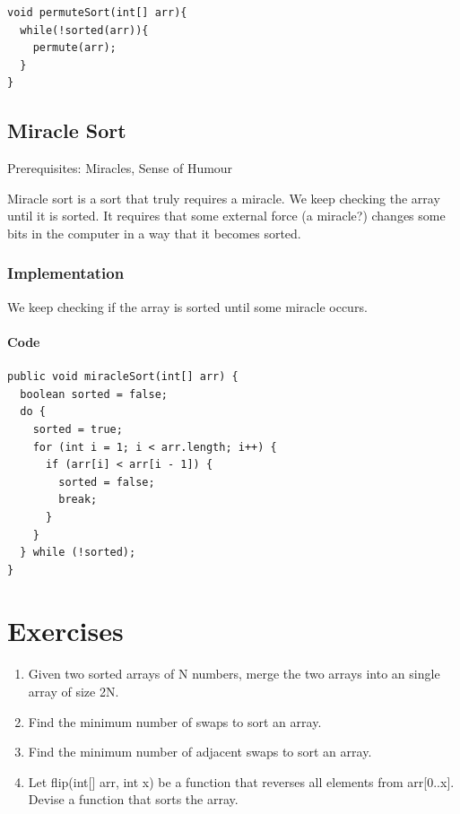 \documentclass[11pt,oneside]{book}
\begin{document}
\begin{lstlisting}
void permuteSort(int[] arr){
  while(!sorted(arr)){
    permute(arr);
  }
}
\end{lstlisting}

        \section{ Miracle Sort }
        

Prerequisites: Miracles, Sense of Humour

Miracle sort is a sort that truly requires a miracle. We keep checking the array until it is sorted. It requires that some external force (a miracle?) changes some bits in the computer in a way that it becomes sorted.

\subsection{Implementation}

We keep checking if the array is sorted until some miracle occurs.

\subsubsection{Code}

\begin{lstlisting}
public void miracleSort(int[] arr) {
  boolean sorted = false;
  do {
    sorted = true;
    for (int i = 1; i < arr.length; i++) {
      if (arr[i] < arr[i - 1]) {
        sorted = false;
        break;
      }
    }
  } while (!sorted);
}
\end{lstlisting}

    \chapter{ Exercises }
    

\begin{enumerate}
\item Given two sorted arrays of N numbers, merge the two arrays into an single array of size 2N.
\item Find the minimum number of swaps to sort an array.
\item Find the minimum number of adjacent swaps to sort an array.
\item Let flip(int[] arr, int x) be a function that reverses all elements from arr[0..x]. Devise a function that sorts the array.
\end{enumerate}
\end{document}
